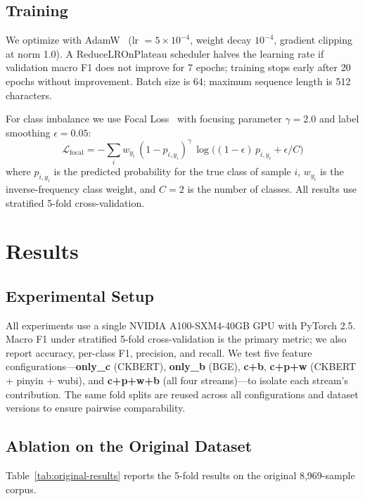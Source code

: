 ﻿\documentclass[12pt]{article}
\begin{document}
\subsection{Training}
We optimize with AdamW~\cite{loshchilov2019adamw} (lr $= 5 \times 10^{-4}$, weight decay $10^{-4}$, gradient clipping at norm 1.0). A ReduceLROnPlateau scheduler halves the learning rate if validation macro F1 does not improve for 7 epochs; training stops early after 20 epochs without improvement. Batch size is 64; maximum sequence length is 512 characters.

For class imbalance we use Focal Loss~\cite{lin2017focal} with focusing parameter $\gamma = 2.0$ and label smoothing $\epsilon = 0.05$:
\[
\mathcal{L}_{\mathrm{focal}} = -\sum_{i} w_{y_i}\,(1 - p_{i,y_i})^{\gamma} \, \log\bigl((1-\epsilon)\,p_{i,y_i} + \epsilon/C\bigr)
\]
where $p_{i,y_i}$ is the predicted probability for the true class of sample $i$, $w_{y_i}$ is the inverse-frequency class weight, and $C=2$ is the number of classes. All results use stratified 5-fold cross-validation.

\section{Results}

\subsection{Experimental Setup}
All experiments use a single NVIDIA A100-SXM4-40GB GPU with PyTorch 2.5. Macro F1 under stratified 5-fold cross-validation is the primary metric; we also report accuracy, per-class F1, precision, and recall. We test five feature configurations---\textbf{only\_c} (CKBERT), \textbf{only\_b} (BGE), \textbf{c+b}, \textbf{c+p+w} (CKBERT + pinyin + wubi), and \textbf{c+p+w+b} (all four streams)---to isolate each stream's contribution. The same fold splits are reused across all configurations and dataset versions to ensure pairwise comparability.

\subsection{Ablation on the Original Dataset}

Table~\ref{tab:original-results} reports the 5-fold results on the original 8{,}969-sample corpus.
\end{document}
